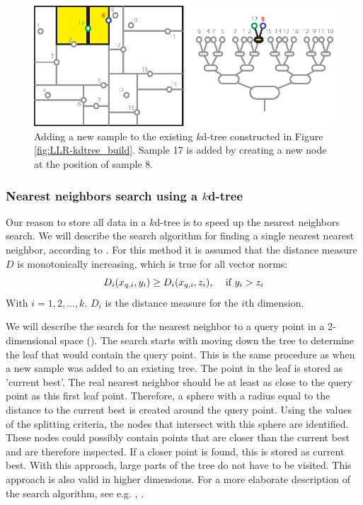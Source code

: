 \begin{figure}[htbp]
	\centering
		\includegraphics[width=.7\textwidth]{img/kdtree_addsample_treev2}
	\caption[Addition of a single sample to a $k$d-tree]{Adding a new sample to the existing $k$d-tree constructed in Figure \ref{fig:LLR-kdtree_build}. Sample 17 is added by creating a new node at the position of sample 8.}
	\label{fig:LLR-kdtree_addsample}
\end{figure}


\subsubsection{Nearest neighbors search using a $k$d-tree}
Our reason to store all data in a $k$d-tree is to speed up the nearest neighbors search. We will describe the search algorithm for finding a single nearest nearest neighbor, according to \cite{Friedman:77}. For this method it is assumed that the distance measure $D$ is monotonically increasing, which is true for all vector norms:
\begin{equation}\label{eqn:LLR-monotonicity}
	D_i(x_{q,i},y_i) \geq D_i(x_{q,i},z_i) \textrm{, \quad    if } y_i > z_i
\end{equation}
With $i = 1, 2, ..., k$. $D_i$ is the distance measure for the $i$th dimension. 

We will describe the search for the nearest neighbor to a query point in a 2-dimensional space (). The search starts with moving down the tree to determine the leaf that would contain the query point. This is the same procedure as when a new sample was added to an existing tree. The point in the leaf is stored as 'current best'. The real nearest neighbor should be at least as close to the query point as this first leaf point. Therefore, a sphere with a radius equal to the distance to the current best is created around the query point. Using the values of the splitting criteria, the nodes that intersect with this sphere are identified. These nodes could possibly contain points that are closer than the current best and are therefore inspected. If a closer point is found, this is stored as current best. With this approach, large parts of the tree do not have to be visited. This approach is also valid in higher dimensions. For a more elaborate description of the search algorithm, see e.g. \cite{Moore:91}, \cite{Friedman:77}.

